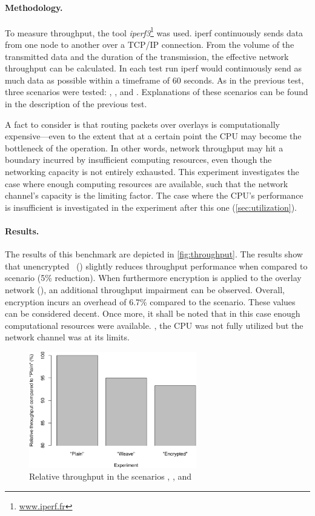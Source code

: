 \paragraph{Methodology.} To measure throughput, the tool \emph{iperf3}\footnote{\url{www.iperf.fr}} was used. iperf continuously sends data from one node to another over a TCP/IP connection. From the volume of the transmitted data and the duration of the transmission, the effective network throughput can be calculated. In each test run iperf would continuously send as much data as possible within a timeframe of 60 seconds. As in the previous test, three scenarios were tested:  , , and . Explanations of these scenarios can be found in the description of the previous test. 

A fact to consider is that routing packets over overlays is computationally expensive---even to the extent that at a certain point the CPU may become the bottleneck of the operation. In other words, network throughput may hit a boundary incurred by insufficient computing resources, even though the networking capacity is not entirely exhausted. This experiment investigates the case where enough computing resources are available, such that the network channel's capacity is the limiting factor. The case where the CPU's performance is insufficient is investigated in the experiment after this one (\cf \ref{sec:utilization}).

\paragraph{Results.}
The results of this benchmark are depicted in \autoref{fig:throughput}. The results show that unencrypted \wnet\ () slightly reduces throughput performance when compared to  scenario (5\% reduction). When furthermore encryption is applied to the overlay network (), an additional throughput impairment can be observed. Overall, encryption incurs an overhead of 6.7\% compared to the  scenario. These values can be considered decent. Once more, it shall be noted that in this case enough computational resources were available. \Ie , the CPU was not fully utilized but the network channel was at its limits.
\begin{figure}[htpb]
  \centering
  \includegraphics[width=0.65\textwidth]{figures/throughput}
  \caption[\weave\ throughput benchmark results]{Relative throughput in the scenarios , , and }\label{fig:throughput}
\end{figure} 
%
%
%
%
%
%
%
%
%
%
